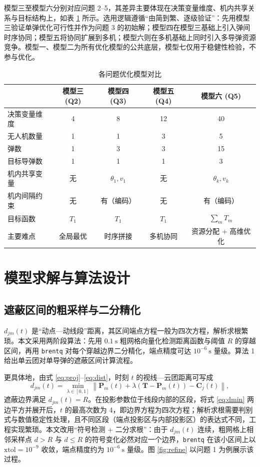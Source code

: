 \documentclass[11pt,a4paper]{ctexart}
\begin{document}
模型三至模型六分别对应问题 2--5，其差异主要体现在决策变量维度、机内共享关系与目标结构上，如表 \ref{tab:modelcmp} 所示。选用逻辑遵循“由简到繁、逐级验证”：先用模型三验证单弹优化可行性并作为问题 3 的初始解；模型四在模型三基础上引入弹间时序协同；模型五将协同扩展到多机；模型六则在多机基础上同时引入多导弹资源竞争。模型一、模型二为所有优化模型的公共底层，模型七仅用于稳健性检验，不参与优化。

\begin{table}[H]
\centering
\caption{各问题优化模型对比}
\label{tab:modelcmp}
\small
\begin{tabular}{lcccc}
\toprule
 & 模型三 (Q2) & 模型四 (Q3) & 模型五 (Q4) & 模型六 (Q5) \\
\midrule
决策变量维度 & 4 & 8 & 12 & 40 \\
无人机数量 & 1 & 1 & 3 & 5 \\
弹数 & 1 & 3 & 3 & 15 \\
目标导弹数 & 1 & 1 & 1 & 3 \\
机内共享变量 & 无 & $\theta_1,v_1$ & 无 & $\theta_k,v_k$ \\
机内间隔约束 & 无 & 有（编码） & 无 & 有（编码） \\
目标函数 & $T_1$ & $T_1$ & $T_1$ & $\sum_m T_m$ \\
主要难点 & 全局最优 & 时序拼接 & 多机协同 & 资源分配 + 高维优化 \\
\bottomrule
\end{tabular}
\end{table}

\section{模型求解与算法设计}

\subsection{遮蔽区间的粗采样与二分精化}

$d_{jm}(t)$ 是“动点—动线段”距离，其区间端点方程一般为四次方程，解析求根繁琐。本文采用两阶段算法：先用 $0.1~\mathrm{s}$ 粗网格向量化检测距离函数与阈值 $R$ 的穿越区间，再用 \texttt{brentq} 对每个穿越边界二分精化，端点精度可达 $10^{-6}~\mathrm{s}$ 量级。算法 1 给出单云团对单导弹的遮蔽区间计算流程。

更具体地，由式 \eqref{eq:proj}--\eqref{eq:dist}，时刻 $t$ 的视线—云团距离可写成
\begin{equation}
  d_{jm}(t)=\min_{\lambda\in[0,1]}\left\|\bm{P}_m(t)+\lambda\left(\bm{T}-\bm{P}_m(t)\right)-\bm{C}_j(t)\right\|,
  \label{eq:dmin}
\end{equation}
遮蔽边界满足 $d_{jm}(t)=R$。在投影参数位于线段内部的区段，将式 \eqref{eq:dmin} 两边平方并展开后，$t$ 的最高次数为 4，即边界方程为四次方程；解析求根需要判别式与数值稳定性处理，且不同区段（端点投影区与内部投影区）的表达式不同，工程实现繁琐。本文改用“符号检测 + 二分求根”：由于 $d_{jm}(t)$ 连续，粗网格上相邻采样点 $d>R$ 与 $d\le R$ 的符号变化必然对应一个边界，\texttt{brentq} 在该小区间上以 $\mathrm{xtol}=10^{-9}$ 收敛，端点精度约为 $10^{-6}~\mathrm{s}$ 量级。图 \ref{fig:refine} 以问题 1 为例展示该过程。
\end{document}
